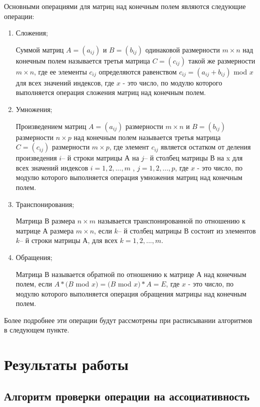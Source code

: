 \documentclass[bachelor, och, labwork]{shiza}
\begin{document}
	Основными операциями для матриц над конечным полем являются следующие операции: 
	\begin{enumerate}
	\item Сложения;
	
	Суммой матриц $A = (a_{ij})$ и $B = (b_{ij})$ одинаковой размерности $m \times n$ над конечным полем называется третья матрица $C = (c_{ij})$ такой же размерности $m \times n$, где ее элементы $c_{ij}$ определяются равенством $c_{ij} = (a_{ij} + b_{ij})$ mod $x$ для всех значений индексов, где $x$ - это число, по модулю которого выполняется операция сложения матриц над конечным полем. 
	
	
	\item Умножения;
	
	Произведением матриц $A = (a_{ij})$ размерности $m \times n$ и $B = (b_{ij})$ размерности $n \times p$ над конечным полем называется третья матрица $C = (c_{ij})$ размерности $m \times p$, где элемент $c_{ij}$ является остатком от деления произведения $i$– й строки матрицы А на $j$– й столбец матрицы В на x для всех значений индексов $i = 1,2,...,m$ , $j = 1,2,...,p$, где $x$ - это число, по модулю которого выполняется операция умножения матриц над конечным полем.  
	
	\item Транспонирования;
	
	Матрица В размера $n \times m$ называется транспонированной по отношению к матрице А размера $m \times n$, если $k$– й столбец матрицы В состоит из элементов $k$– й строки матрицы А, для всех $k = 1,2,...,m$.
	
	\item Обращения;
	
	Матрица В называется обратной по отношению к матрице А над конечным полем, если
	$A * (B$ mod $x) = (B$ mod $x) * A = E$, где $x$ - это число, по модулю которого выполняется операция обращения матрицы над конечным полем. 
	
	\end{enumerate}

	Более подробнее эти операции будут рассмотрены при расписывании алгоритмов в следующем пункте.
	\section{Результаты работы}
	
	\subsection{Алгоритм проверки операции на ассоциативность}
	
\end{document}

